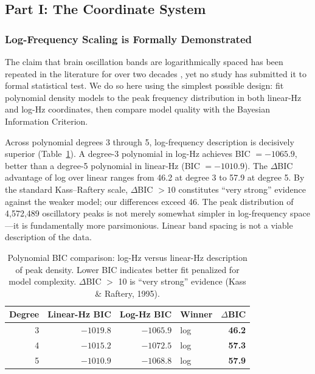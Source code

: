 \subsection{Part I: The Coordinate System}
\label{sec:scaling}

\subsubsection{Log-Frequency Scaling is Formally Demonstrated}
\label{sec:logscaling}

The claim that brain oscillation bands are logarithmically spaced has been repeated in the literature for over two decades \parencite{penttonen2003natural,buzsaki2004neuronal}, yet no study has submitted it to formal statistical test. We do so here using the simplest possible design: fit polynomial density models to the peak frequency distribution in both linear-Hz and log-Hz coordinates, then compare model quality with the Bayesian Information Criterion.

Across polynomial degrees 3 through 5, log-frequency description is decisively superior (Table~\ref{tab:polynomial_bic}). A degree-3 polynomial in log-Hz achieves BIC $= -1065.9$, better than a degree-5 polynomial in linear-Hz (BIC $= -1010.9$). The $\Delta$BIC advantage of log over linear ranges from 46.2 at degree 3 to 57.9 at degree 5. By the standard Kass--Raftery scale, $\Delta$BIC $> 10$ constitutes ``very strong'' evidence against the weaker model; our differences exceed 46. The peak distribution of 4,572,489 oscillatory peaks is not merely somewhat simpler in log-frequency space---it is fundamentally more parsimonious. Linear band spacing is not a viable description of the data.

\begin{table}[h]
\centering
\caption{Polynomial BIC comparison: log-Hz versus linear-Hz description of peak density.
Lower BIC indicates better fit penalized for model complexity.
$\Delta$BIC $>$ 10 is ``very strong'' evidence (Kass \& Raftery, 1995).}
\label{tab:polynomial_bic}
\begin{tabular}{r r r l r}
\toprule
Degree & Linear-Hz BIC & Log-Hz BIC & Winner & $\Delta$BIC \\
\midrule
3 & $-1019.8$ & $-1065.9$ & log & \textbf{46.2} \\
4 & $-1015.2$ & $-1072.5$ & log & \textbf{57.3} \\
5 & $-1010.9$ & $-1068.8$ & log & \textbf{57.9} \\
\bottomrule
\end{tabular}
\end{table}

